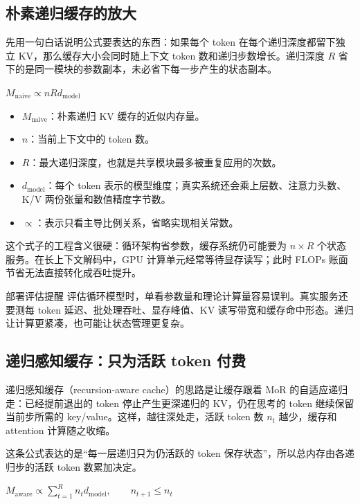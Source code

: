 ﻿\documentclass[a4paper]{article}
\begin{document}
\subsection{朴素递归缓存的放大}

先用一句白话说明公式要表达的东西：如果每个 token 在每个递归深度都留下独立 KV，那么缓存大小会同时随上下文 token 数和递归步数增长。递归深度 \(R\) 省下的是同一模块的参数副本，未必省下每一步产生的状态副本。

$
M_{\mathrm{naive}}\propto nR d_{\mathrm{model}}
$

\begin{itemize}
  \item \(M_{\mathrm{naive}}\)：朴素递归 KV 缓存的近似内存量。
  \item \(n\)：当前上下文中的 token 数。
  \item \(R\)：最大递归深度，也就是共享模块最多被重复应用的次数。
  \item \(d_{\mathrm{model}}\)：每个 token 表示的模型维度；真实系统还会乘上层数、注意力头数、K/V 两份张量和数值精度字节数。
  \item \(\propto\)：表示只看主导比例关系，省略实现相关常数。
\end{itemize}

这个式子的工程含义很硬：循环架构省参数，缓存系统仍可能要为 \(n\times R\) 个状态服务。在长上下文解码中，GPU 计算单元经常等待显存读写；此时 FLOPs 账面节省无法直接转化成吞吐提升。

\begin{warningbox}{部署评估提醒}
评估循环模型时，单看参数量和理论计算量容易误判。真实服务还要测每 token 延迟、批处理吞吐、显存峰值、KV 读写带宽和缓存命中形态。递归让计算更紧凑，也可能让状态管理更复杂。
\end{warningbox}

\subsection{递归感知缓存：只为活跃 token 付费}

递归感知缓存（recursion-aware cache）的思路是让缓存跟着 MoR 的自适应递归走：已经提前退出的 token 停止产生更深递归的 KV，仍在思考的 token 继续保留当前步所需的 key/value。这样，越往深处走，活跃 token 数 \(n_t\) 越少，缓存和 attention 计算随之收缩。

这条公式表达的是“每一层递归只为仍活跃的 token 保存状态”，所以总内存由各递归步的活跃 token 数累加决定。

$
M_{\mathrm{aware}}\propto \sum_{t=1}^{R} n_t d_{\mathrm{model}},\qquad n_{t+1}\le n_t
$
\end{document}
